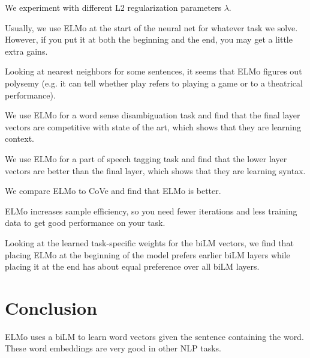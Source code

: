 \documentclass[a4paper]{article}
\begin{document}
We experiment with different L2 regularization parameters $\lambda$.

Usually, we use ELMo at the start of the neural net for whatever task we solve.
However, if you put it at both the beginning and the end, you may get a little
extra gains.

Looking at nearest neighbors for some sentences, it seems that ELMo figures out
polysemy (e.g. it can tell whether play refers to playing a game or to a
theatrical performance).

We use ELMo for a word sense disambiguation task and find that the final
layer vectors are competitive with state of the art, which shows that they
are learning context.

We use ELMo for a part of speech tagging task and find that the lower layer
vectors are better than the final layer, which shows that they are learning
syntax.

We compare ELMo to CoVe and find that ELMo is better.

ELMo increases sample efficiency, so you need fewer iterations and less training
data to get good performance on your task.

Looking at the learned task-specific weights for the biLM vectors, we find that
placing ELMo at the beginning of the model prefers earlier biLM layers while
placing it at the end has about equal preference over all biLM layers.

\section{Conclusion}
ELMo uses a biLM to learn word vectors given the sentence containing the word.
These word embeddings are very good in other NLP tasks.
\end{document}
